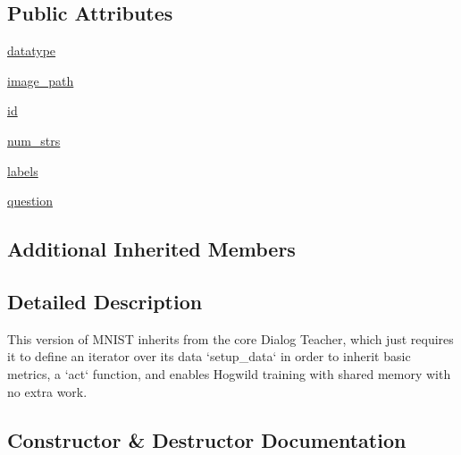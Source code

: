 \subsection*{Public Attributes}
\begin{DoxyCompactItemize}
\item 
\hyperlink{classparlai_1_1tasks_1_1mnist__qa_1_1agents_1_1MnistQATeacher_a813aa1c2a680e44e88ecb2832d99d51f}{datatype}
\item 
\hyperlink{classparlai_1_1tasks_1_1mnist__qa_1_1agents_1_1MnistQATeacher_a7c93f12d922a5f35699379983acfd5f0}{image\+\_\+path}
\item 
\hyperlink{classparlai_1_1tasks_1_1mnist__qa_1_1agents_1_1MnistQATeacher_a5f5642ab4593624e0f9a0a633deebf40}{id}
\item 
\hyperlink{classparlai_1_1tasks_1_1mnist__qa_1_1agents_1_1MnistQATeacher_aaee79511f7f1ec89e8701435e5b95036}{num\+\_\+strs}
\item 
\hyperlink{classparlai_1_1tasks_1_1mnist__qa_1_1agents_1_1MnistQATeacher_aa6621e4f56e5cdb9cb5d24bc439e2083}{labels}
\item 
\hyperlink{classparlai_1_1tasks_1_1mnist__qa_1_1agents_1_1MnistQATeacher_a79fbc5e429e1ee91b592fc6da4675c54}{question}
\end{DoxyCompactItemize}
\subsection*{Additional Inherited Members}


\subsection{Detailed Description}
\begin{DoxyVerb}This version of MNIST inherits from the core Dialog Teacher, which just requires it
to define an iterator over its data `setup_data` in order to inherit basic metrics,
a `act` function, and enables Hogwild training with shared memory with no extra
work.
\end{DoxyVerb}
 

\subsection{Constructor \& Destructor Documentation}
\mbox{\label{classparlai_1_1tasks_1_1mnist__qa_1_1agents_1_1MnistQATeacher_a6ef124a2cc6ff3edc13291768fafbe29}} 

